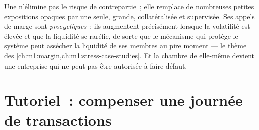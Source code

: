 \begin{remark}\label{rem:m1:clearing-and-settlement:concentration}
Une  n'élimine pas le risque de contrepartie~; elle remplace de nombreuses
petites expositions opaques par une seule, grande, collatéralisée et supervisée. Ses appels de
marge sont \emph{procycliques}~: ils augmentent précisément lorsque la volatilité est élevée et que
la liquidité se raréfie, de sorte que le mécanisme qui protège le système peut assécher la
liquidité de ses membres au pire moment --- le thème des
\cref{ch:m1:margin,ch:m1:stress-case-studies}. Et la chambre de  elle-même
devient une entreprise qui ne peut pas être autorisée à faire défaut.
\end{remark}

\section{Tutoriel~: compenser une journée de transactions}\label{tut:m1:clearing-and-settlement:netting}

